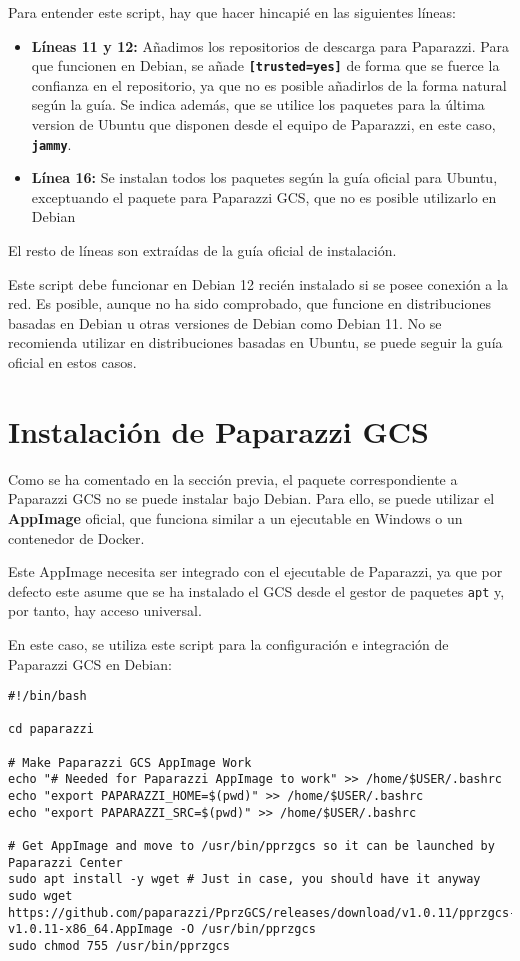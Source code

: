 Para entender este script, hay que hacer hincapié en las siguientes líneas:

\begin{itemize}
    \item \textbf{Líneas 11 y 12:} Añadimos los repositorios de descarga para Paparazzi. Para que funcionen en Debian, 
    se añade \texttt{\textbf{[trusted=yes]}} de forma que se fuerce la confianza en el repositorio, ya que no es posible añadirlos de la forma natural según la guía. 
    Se indica además, que se utilice los paquetes para la última version de Ubuntu que disponen desde el equipo de Paparazzi, en este caso, \texttt{\textbf{jammy}}.

    \item \textbf{Línea 16:} Se instalan todos los paquetes según la guía oficial para Ubuntu, exceptuando el paquete para Paparazzi GCS, que no es posible utilizarlo en Debian
\end{itemize}

El resto de líneas son extraídas de la guía oficial de instalación.

Este script debe funcionar en Debian 12 recién instalado si se posee conexión a la red. 
Es posible, aunque no ha sido comprobado, que funcione en distribuciones basadas en Debian u otras versiones de Debian como Debian 11. 
No se recomienda utilizar en distribuciones basadas en Ubuntu, se puede seguir la guía oficial en estos casos.

\section{Instalación de Paparazzi GCS}
Como se ha comentado en la sección previa, el paquete correspondiente a Paparazzi GCS no se puede instalar bajo Debian.
Para ello, se puede utilizar el \textbf{AppImage} oficial, que funciona similar a un ejecutable en Windows o un contenedor de Docker.

Este AppImage necesita ser integrado con el ejecutable de Paparazzi, ya que por defecto este asume que se ha instalado 
el GCS desde el gestor de paquetes \texttt{apt} y, por tanto, hay acceso universal.

En este caso, se utiliza este script para la configuración e integración de Paparazzi GCS en Debian:

\begin{lstlisting}[style=CodigoBash]
#!/bin/bash

cd paparazzi

# Make Paparazzi GCS AppImage Work
echo "# Needed for Paparazzi AppImage to work" >> /home/$USER/.bashrc
echo "export PAPARAZZI_HOME=$(pwd)" >> /home/$USER/.bashrc
echo "export PAPARAZZI_SRC=$(pwd)" >> /home/$USER/.bashrc

# Get AppImage and move to /usr/bin/pprzgcs so it can be launched by Paparazzi Center
sudo apt install -y wget # Just in case, you should have it anyway
sudo wget https://github.com/paparazzi/PprzGCS/releases/download/v1.0.11/pprzgcs-v1.0.11-x86_64.AppImage -O /usr/bin/pprzgcs
sudo chmod 755 /usr/bin/pprzgcs
\end{lstlisting}

